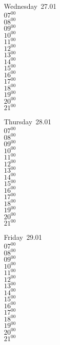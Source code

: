 \documentclass[11pt,a4paper]{book}\usepackage[]{graphicx}\usepackage[]{color}
\begin{document}
\begin{weekdaybox}
  Wednesday~27.01\\
  { 
  \vfill
  $07^{00}$\\
$08^{00}$\\
$09^{00}$\\
$10^{00}$\\
$11^{00}$\\
$12^{00}$\\
$13^{00}$\\
$14^{00}$\\
$15^{00}$\\
$16^{00}$\\
$17^{00}$\\
$18^{00}$\\
$19^{00}$\\
$20^{00}$\\
$21^{00}$\\
  }
\end{weekdaybox}
\clearpage
\begin{headerbox}
\end{headerbox}
\begin{weekdaybox}
  Thursday~28.01\\
  { 
  \vfill
  $07^{00}$\\
$08^{00}$\\
$09^{00}$\\
$10^{00}$\\
$11^{00}$\\
$12^{00}$\\
$13^{00}$\\
$14^{00}$\\
$15^{00}$\\
$16^{00}$\\
$17^{00}$\\
$18^{00}$\\
$19^{00}$\\
$20^{00}$\\
$21^{00}$\\
  }
\end{weekdaybox} 
\begin{weekdaybox}
  Friday~29.01\\
  { 
  \vfill
  $07^{00}$\\
$08^{00}$\\
$09^{00}$\\
$10^{00}$\\
$11^{00}$\\
$12^{00}$\\
$13^{00}$\\
$14^{00}$\\
$15^{00}$\\
$16^{00}$\\
$17^{00}$\\
$18^{00}$\\
$19^{00}$\\
$20^{00}$\\
$21^{00}$\\
  }
\end{weekdaybox}
\end{document}
